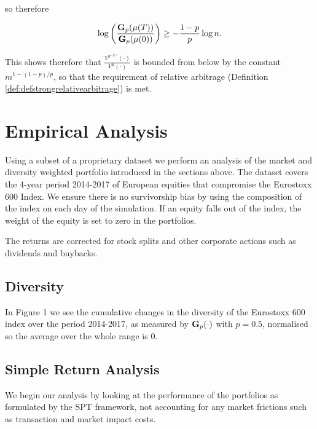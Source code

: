 \documentclass[british]{amsart} \usepackage{lmodern}
\numberwithin{equation}{section} \numberwithin{figure}{section}
\theoremstyle{plain} \newtheorem{thm}{\protect\theoremname}[section]
\theoremstyle{definition} \newtheorem{defn}[thm]{\protect\definitionname}
\theoremstyle{plain} \newtheorem{assumption}[thm]{\protect\assumptionname}
\theoremstyle{plain} \newtheorem{lem}[thm]{\protect\lemmaname}
\theoremstyle{plain} \newtheorem{prop}[thm]{\protect\propositionname}
\theoremstyle{remark} \newtheorem{rem}[thm]{\protect\remarkname}
\theoremstyle{plain} \newtheorem{cor}[thm]{\protect\corollaryname}
\begin{document}
so therefore

\begin{equation}
  \log \left( \frac{\mathbf{G}_{p}(\mu(T))}{\mathbf{G}_{p}(\mu(0))} \right) \ge 
      - \frac{1-p}{p} \log{n}. 
\end{equation}

This shows therefore that $\frac{V^{\pi^{(p)}}(\cdot)}{V^{\mu}(\cdot)}$ is
bounded from below by the constant $m^{1-(1-p)/p}$, so that the requirement of
relative arbitrage (Definition \ref{def:defstrongrelativearbitrage}) is met.
\newpage
\section{Empirical Analysis}


Using a subset of a proprietary dataset we perform an analysis of the market and
diversity weighted portfolio introduced in the sections above. The dataset
covers the 4-year period 2014-2017 of European equities that compromise the
Eurostoxx 600 Index. We ensure there is no survivorship bias by using the
composition of the index on each day of the simulation. If an equity falls out
of the index, the weight of the equity is set to zero in the portfolios.

The returns are corrected for stock splits and other corporate actions such as
dividends and buybacks.

\subsection{Diversity}

In Figure 1 we see the cumulative changes in the diversity of the Eurostoxx 600
index over the period 2014-2017, as measured by $\mathbf{G}_{p}(\cdot)$ with $p=0.5$,
normalised so the average over the whole range is 0.


\subsection{Simple Return Analysis}

We begin our analysis by looking at the performance of the portfolios as
formulated by the SPT framework, not accounting for any market frictions such as
transaction and market impact costs.
\end{document}
